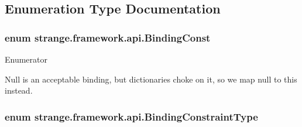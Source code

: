 \subsection{Enumeration Type Documentation}
\hypertarget{namespacestrange_1_1framework_1_1api_adcc058ca6ff0fe013ffdbf63ada74a97}{
\subsubsection[{Binding\-Const}]{\setlength{\rightskip}{0pt plus 5cm}enum {\bf strange.\-framework.\-api.\-Binding\-Const}}}\label{namespacestrange_1_1framework_1_1api_adcc058ca6ff0fe013ffdbf63ada74a97}
\begin{Desc}
\item[Enumerator]\par
\begin{description}
\item[{\em 
\hypertarget{namespacestrange_1_1framework_1_1api_adcc058ca6ff0fe013ffdbf63ada74a97a5f32587ea07e2a7ad41b7461e159da30}{N\-U\-L\-L\-O\-I\-D}\label{namespacestrange_1_1framework_1_1api_adcc058ca6ff0fe013ffdbf63ada74a97a5f32587ea07e2a7ad41b7461e159da30}
}]Null is an acceptable binding, but dictionaries choke on it, so we map null to this instead. \end{description}
\end{Desc}
\hypertarget{namespacestrange_1_1framework_1_1api_a9819c5ab6d03a2cbce2d3dddf5264e42}{
\subsubsection[{Binding\-Constraint\-Type}]{\setlength{\rightskip}{0pt plus 5cm}enum {\bf strange.\-framework.\-api.\-Binding\-Constraint\-Type}}}\label{namespacestrange_1_1framework_1_1api_a9819c5ab6d03a2cbce2d3dddf5264e42}
